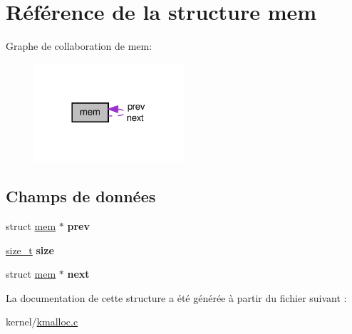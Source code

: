 \hypertarget{structmem}{\section{\-Référence de la structure mem}
\label{structmem}
}


\-Graphe de collaboration de mem\-:\nopagebreak
\begin{figure}[H]
\begin{center}
\leavevmode
\includegraphics[width=158pt]{structmem__coll__graph}
\end{center}
\end{figure}
\subsection*{\-Champs de données}
\begin{DoxyCompactItemize}
\item 
\hypertarget{structmem_a2edfcacfe26d9112b0e4f745c9f75cf7}{struct \hyperlink{structmem}{mem} $\ast$ {\bfseries prev}}\label{structmem_a2edfcacfe26d9112b0e4f745c9f75cf7}

\item 
\hypertarget{structmem_a7d695ebc3fafa769e7e7a75f1d232a18}{\hyperlink{types_8h_a29d85914ddff32967d85ada69854206d}{size\-\_\-t} {\bfseries size}}\label{structmem_a7d695ebc3fafa769e7e7a75f1d232a18}

\item 
\hypertarget{structmem_ad12075ee870ccc6f67f420f09ff37732}{struct \hyperlink{structmem}{mem} $\ast$ {\bfseries next}}\label{structmem_ad12075ee870ccc6f67f420f09ff37732}

\end{DoxyCompactItemize}


\-La documentation de cette structure a été générée à partir du fichier suivant \-:\begin{DoxyCompactItemize}
\item 
kernel/\hyperlink{kmalloc_8c}{kmalloc.\-c}\end{DoxyCompactItemize}
